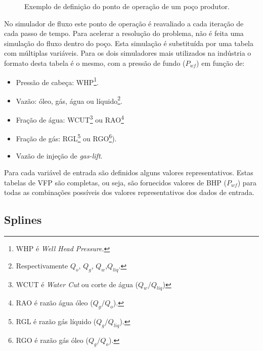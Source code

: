 \documentclass[final,5p]{elsarticle}
\numberwithin{equation}{section}
\begin{document}
\begin{figure}[hbt!]
            \caption{Exemplo de definição do ponto de operação de um poço produtor.}
            \label{fig:ipr}
        \end{figure}

        No simulador de fluxo este ponto de operação é reavaliado a cada iteração de cada passo de tempo. Para acelerar a resolução do problema, não é feita uma simulação do fluxo dentro do poço. Esta simulação é substituída por uma tabela com múltiplas variáveis. Para os dois simuladores mais utilizados na indústria o formato desta tabela é o mesmo, com a pressão de fundo ($P_{wf}$) em função de:

        \begin{itemize}
            \item Pressão de cabeça: WHP\footnote{WHP é \emph{Well Head Pressure}.}.
            \item Vazão: óleo, gás, água ou líquido\footnote{Respectivamente $Q_o$, $Q_g$, $Q_w$,$Q_{liq}$.}.
            \item Fração de água: WCUT\footnote{WCUT é \emph{Water Cut} ou corte de água ($Q_w/Q_{liq}$)} ou RAO\footnote{RAO é razão água óleo ($Q_g/Q_o$).}
            \item Fração de gás: RGL\footnote{RGL é razão gás líquido ($Q_g/Q_{liq}$).} ou RGO\footnote{RGO é razão gás óleo ($Q_g/Q_o$).}).
            \item Vazão de injeção de \emph{gas-lift}.
        \end{itemize}

        Para cada variável de entrada são definidos alguns valores representativos. Estas tabelas de VFP são completas, ou seja, são fornecidos valores de BHP ($P_{wf}$) para todas as combinações possíveis dos valores representativos dos dados de entrada.    

    \subsection{Splines}
    
\end{document}
